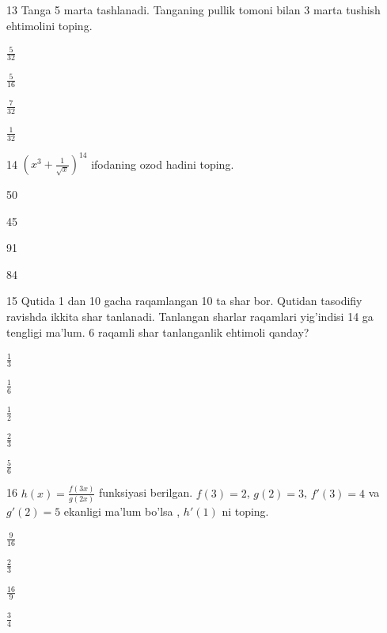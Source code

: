 \documentclass[14pt]{article}
\begin{document}
\begin{questionbox}{13}
    Tanga 5 marta tashlanadi. Tanganing pullik tomoni bilan 3 marta tushish ehtimolini toping.
    \begin{options}
        \item \(\frac{5}{32}\)
        \item \(\frac{5}{16}\)
        \item \(\frac{7}{32}\)
        \item \(\frac{1}{32}\)
    \end{options}
\end{questionbox}

\begin{questionbox}{14}
    \((x^3 + \frac{1}{\sqrt{x}})^{14}\) ifodaning ozod hadini toping.
    \begin{options}
        \item 50
        \item 45
        \item 91
        \item 84
    \end{options}
\end{questionbox}

\begin{questionbox}{15}
    Qutida 1 dan 10 gacha raqamlangan 10 ta shar bor. Qutidan tasodifiy ravishda ikkita shar tanlanadi. Tanlangan sharlar raqamlari yig'indisi 14 ga tengligi ma'lum. 6 raqamli shar tanlanganlik ehtimoli qanday?
    \begin{options}
        \item \(\frac{1}{3}\)
        \item \(\frac{1}{6}\)
        \item \(\frac{1}{2}\)
        \item \(\frac{2}{3}\)
        \item \(\frac{5}{6}\)
    \end{options}
\end{questionbox}

\begin{questionbox}{16}
    \(h(x) = \frac{f(3x)}{g(2x)}\) funksiyasi berilgan. \(f(3) = 2\), \(g(2) = 3\), \(f'(3) = 4\) va \(g'(2) = 5\) ekanligi ma'lum bo'lsa , \(h'(1)\) ni toping.
    \begin{options}
        \item \(\frac{9}{16}\)
        \item \(\frac{2}{3}\)
        \item \(\frac{16}{9}\)
        \item \(\frac{3}{4}\)
    \end{options}
\end{questionbox}
\end{document}

